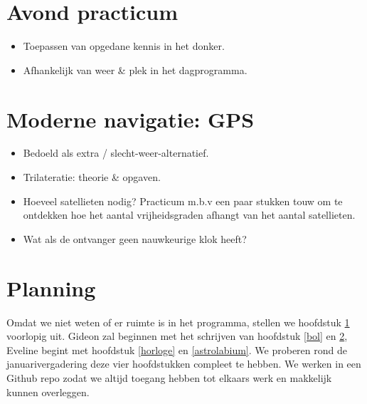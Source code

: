 \documentclass[a4paper,10pt]{article}
\begin{document}
\section{Avond practicum} \label{avond}
\begin{itemize}
 \item Toepassen van opgedane kennis in het donker.
 \item Afhankelijk van weer \& plek in het dagprogramma.
\end{itemize}

\section{Moderne navigatie: GPS} \label{gps}
\begin{itemize}
 \item Bedoeld als extra / slecht-weer-alternatief.
 \item Trilateratie: theorie \& opgaven.
 \item Hoeveel satellieten nodig? Practicum m.b.v een paar stukken touw om te ontdekken hoe het aantal vrijheidsgraden afhangt van het aantal satellieten.
 \item Wat als de ontvanger geen nauwkeurige klok heeft?
\end{itemize}

\section{Planning}
Omdat we niet weten of er ruimte is in het programma, stellen we hoofdstuk \ref{avond} voorlopig uit. Gideon zal beginnen met het schrijven van hoofdstuk \ref{bol} en \ref{gps}, Eveline begint met hoofdstuk \ref{horloge} en \ref{astrolabium}. We proberen rond de januarivergadering deze vier hoofdstukken compleet te hebben. We werken in een Github repo zodat we altijd toegang hebben tot elkaars werk en makkelijk kunnen overleggen.
\end{document}
